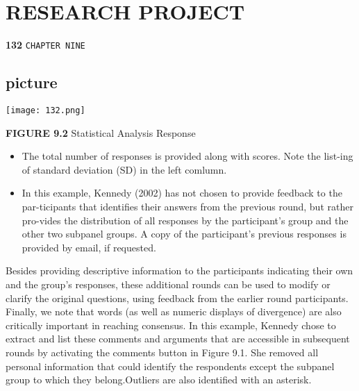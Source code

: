 \documentclass[a4,9pt]{beamer}
\begin{document}
\begin{frame}
\section*{RESEARCH PROJECT}
\begin{flushleft}
\textbf{132}\hspace*{1cm} \texttt{CHAPTER NINE}
\end{flushleft}

\vspace*{0.3cm}
\begin{center}
\section{picture}
\texttt{[image: 132.png]}

\end{center}
\end{frame}

\begin{frame}
\textbf{FIGURE 9.2} \hspace*{0.1cm} Statistical Analysis Response \\

\vspace*{0.3cm}
\begin{itemize}
  \item The total number of responses is provided along with scores. Note the list-ing of standard deviation (SD) in the left comlumn.\\
  \item In this example, Kennedy (2002) has not chosen to provide feedback to the par-ticipants that identifies their answers from the previous round, but rather pro-vides the distribution of all responses by the participant's group and the other two subpanel groups. A copy of the participant's previous responses is provided by email, if requested.\\
\end{itemize}

\vspace*{0.2cm}
Besides providing descriptive information to the participants indicating their own and the group's responses, these additional rounds can be used to modify or clarify the original questions, using feedback from the earlier round participants.\\
\hspace{0.5cm} Finally, we note that words (as well as numeric displays of divergence) are also critically important in reaching consensus. In this example, Kennedy chose to extract and list these comments and arguments that are accessible in subsequent rounds by activating the comments button in Figure 9.1. She removed all personal information that could identify the respondents except the subpanel group to which they belong.Outliers are also identified with an asterisk.\\
\end{frame}
\end{document}
